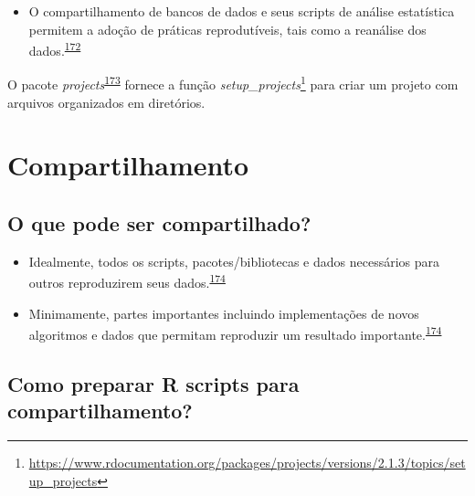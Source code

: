 \documentclass[
  a4paper,
]{book}
\providecommand{\tightlist}{%
  \setlength{\itemsep}{0pt}\setlength{\parskip}{0pt}}
\renewcommand{\href}[2]{#2\footnote{\url{#1}}}
\newenvironment{infobox}[1]
  {
  \begin{itemize}
  \renewcommand{\labelitemi}{
    \raisebox{-.7\height}[0pt][0pt]{
      {\setkeys{Gin}{width=3em,keepaspectratio}
        \texttt{[image: \#1]}}
    }
  }
  \setlength{\fboxsep}{1em}
  \begin{blackbox}
  \item
  }
  {
  \end{blackbox}
  \end{itemize}
  }
\begin{document}
\begin{itemize}
\tightlist
\item
  O compartilhamento de bancos de dados e seus scripts de análise estatística permitem a adoção de práticas reprodutíveis, tais como a reanálise dos dados.\textsuperscript{\protect\hyperlink{ref-ioannidis2014}{172}}
\end{itemize}

\begin{infobox}{images/Rlogo}
O pacote \emph{projects}\textsuperscript{\protect\hyperlink{ref-projects}{173}} fornece a função \href{https://www.rdocumentation.org/packages/projects/versions/2.1.3/topics/setup_projects}{\emph{setup\_projects}} para criar um projeto com arquivos organizados em diretórios.

\end{infobox}

\hypertarget{compartilhamento}{%
\section{Compartilhamento}\label{compartilhamento}}

\hypertarget{o-que-pode-ser-compartilhado}{%
\subsection{O que pode ser compartilhado?}\label{o-que-pode-ser-compartilhado}}

\begin{itemize}
\item
  Idealmente, todos os scripts, pacotes/bibliotecas e dados necessários para outros reproduzirem seus dados.\textsuperscript{\protect\hyperlink{ref-Eglen2017}{174}}
\item
  Minimamente, partes importantes incluindo implementações de novos algoritmos e dados que permitam reproduzir um resultado importante.\textsuperscript{\protect\hyperlink{ref-Eglen2017}{174}}
\end{itemize}

\hypertarget{como-preparar-r-scripts-para-compartilhamento}{%
\subsection{Como preparar R scripts para compartilhamento?}\label{como-preparar-r-scripts-para-compartilhamento}}
\end{document}
